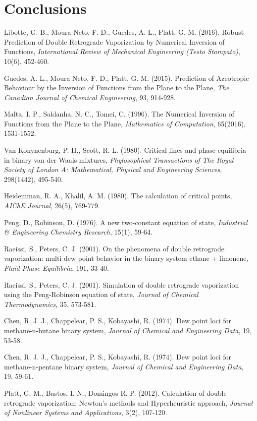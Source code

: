 \documentclass{article}
\theoremstyle{definition}
\theoremstyle{remark}
\begin{document}
\section{Conclusions}

\begin{thebibliography}{99}

 Libotte, G. B., Moura Neto, F. D., Guedes, A. L., Platt, G. M. (2016). Robust Prediction of Double Retrograde Vaporization
by Numerical Inversion of Functions, \emph{International Review of Mechanical Engineering (Testo Stampato)}, 10(6), 452-460.

 Guedes, A. L., Moura Neto, F. D., Platt, G. M. (2015). Prediction of Azeotropic Behaviour by the Inversion of Functions from the Plane to the Plane, \emph{The Canadian Journal of Chemical Engineering}, 93, 914-928.

 Malta, I. P., Saldanha, N. C., Tomei, C. (1996). The Numerical Inversion of Functions from the Plane to the Plane, \emph{Mathematics of Computation}, 65(2016), 1531-1552.

 Van Konynenburg, P. H., Scott, R. L. (1980). Critical lines and phase equilibria in binary van der Waals mixtures, \emph{Phylosophical Transactions of The Royal Society of London A: Mathematical, Physical and Engineering Sciences}, 298(1442), 495-540.

 Heidemman, R. A., Khalil, A. M. (1980). The calculation of critical points, \emph{AIChE Journal}, 26(5), 769-779.

 Peng, D., Robinson, D. (1976). A new two-constant equation of state, \emph{Industrial \& Engineering Chemistry Research}, 15(1), 59-64.

 Raeissi, S., Peters, C. J. (2001). On the phenomena of double retrograde vaporization: multi dew point behavior in the binary system ethane + limonene, \emph{Fluid Phase Equilibria}, 191, 33-40.

 Raeissi, S., Peters, C. J. (2001). Simulation of double retrograde
vaporization using the Peng-Robinson equation of state, \emph{Journal of Chemical Thermodynamics}, 35, 573-581.

 Chen, R. J. J., Chappelear, P. S., Kobayashi, R. (1974). Dew point loci for methane-n-butane binary system, \emph{Journal of Chemical and Engineering Data}, 19, 53-58.

 Chen, R. J. J., Chappelear, P. S., Kobayashi, R. (1974). Dew point loci for methane-n-pentane binary system, \emph{Journal of Chemical and Engineering Data}, 19, 59-61.

 Platt, G. M., Bastos, I. N., Domingos R. P. (2012). Calculation of double retrograde vaporization: Newton's methods and Hyperheuristic approach, \emph{Journal of Nonlinear Systems and Applications}, 3(2), 107-120.

\end{thebibliography}
\end{document}
